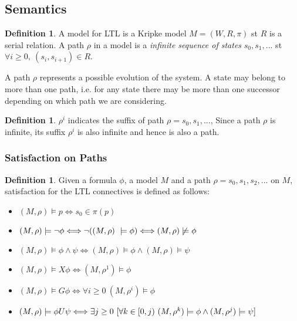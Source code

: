 \documentclass{article}
\theoremstyle{plain}
\theoremstyle{definition}
\newtheorem{defn}[thm]{Definition} %
\begin{document}
\begin{multicols}{2}
\subsection{Semantics}

\begin{defn}A model for LTL is a Kripke model $M = (W, R, \pi)$ st $R$ is a serial relation. A path $\rho$ in a model is a \textit{infinite sequence of states} $s_0, s_1, ...$ st $\forall i \geq 0,\ (s_i, s_{i+1})\in R$. \end{defn}

A path $\rho$ represents a possible evolution of the system. A state may belong to more than one path, i.e. for any state there may be more than one successor depending on which path we are considering.

\begin{defn}$\rho^i$ indicates the suffix of path $\rho = s_0,s_1,...$, Since a path $\rho$ is infinite, its suffix $\rho^i$ is also infinite and hence is also a path.\end{defn}

\subsubsection{Satisfaction on Paths}\label{subsubsec:LTLSemanticsPath}
\begin{defn}\label{defn:ltlsatisfaction}
Given a formula $\phi$, a model $M$ and a path $\rho = s_0, s_1, s_2,...$ on $M$, satisfaction for the LTL connectives is defined as follows:
\end{defn}

\begin{itemize}
\item $(M, \rho) \models p \Longleftrightarrow s_0 \in \pi(p)$
\item $(M, \rho) \models \lnot\phi \Longleftrightarrow \lnot ((M, \rho)\ \models \phi)\\ \Longleftrightarrow (M, \rho) \not\models \phi$
\item $(M, \rho) \models \phi\land\psi \Longleftrightarrow (M, \rho) \models \phi \land (M, \rho) \models \psi$
\item $(M, \rho) \models X\phi \Longleftrightarrow (M, \rho^1) \models \phi$
\item $(M, \rho) \models G\phi \Longleftrightarrow \forall i \geq 0\ (M, \rho^i) \models \phi$
\item $(M, \rho) \models \phi U\psi \Longleftrightarrow\\ \exists j \geq 0\ \lbrack\forall k \in [0, j)\ (M, \rho^k) \models \phi \land (M, \rho^j) \models \psi\rbrack$
\end{itemize}


\end{multicols}
\end{document}
